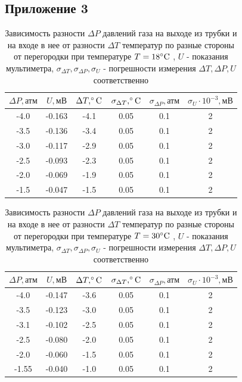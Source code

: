 \subsection{Приложение 3} \label{Приложение 3}
\begin{table}[h]
    \centering
    \begin{tabular}{|c|c|c|c|c|c|}
    \hline
    $\Delta P, \text{атм}$ & $U, \text{мВ}$ & $\Delta T, \celsius$  & $\sigma_{\Delta T}, \celsius$  & $\sigma_{\Delta P}, \text{атм}$ & $\sigma_U\cdot 10^{-3}, \text{мВ}$ \\ \hline
     -4.0 & -0.163  & -4.1   & 0.05   & 0.1   & 2 \\ \hline
     -3.5 & -0.136  & -3.4   & 0.05   & 0.1   & 2 \\ \hline
     -3.0 & -0.117  & -2.9   & 0.05   & 0.1   & 2 \\ \hline
     -2.5 & -0.093  & -2.3   & 0.05   & 0.1   & 2 \\ \hline
     -2.0 & -0.069  & -1.9   & 0.05   & 0.1   & 2 \\ \hline
     -1.5 & -0.047  & -1.5   & 0.05   & 0.1   & 2 \\ \hline
\end{tabular}
    \caption{Зависимость разности $\Delta P$ давлений газа на выходе из трубки и на входе в нее от разности $\Delta T$ температур по разные стороны от перегородки при температуре $T = 18\celsius$ , $U$ - показания мультиметра, $\sigma_{\Delta T}, \sigma_{\Delta P}, \sigma_U$ - погрешности измерения $\Delta T, \Delta P, U$ соответственно}
    \label{tab:t1}
\end{table}

\begin{table}[h]
    \centering
    \begin{tabular}{|c|c|c|c|c|c|}
    \hline
    $\Delta P, \text{атм}$ & $U, \text{мВ}$ & $\Delta T, \celsius$  & $\sigma_{\Delta T}, \celsius$  & $\sigma_{\Delta P}, \text{атм}$ & $\sigma_U\cdot 10^{-3}, \text{мВ}$ \\ \hline
     -4.0  & -0.147  & -3.6   & 0.05   & 0.1   & 2 \\ \hline
     -3.5  & -0.123  & -3.0   & 0.05   & 0.1   & 2 \\ \hline
     -3.1  & -0.102  & -2.5   & 0.05   & 0.1   & 2 \\ \hline
     -2.5  & -0.080  & -2.0   & 0.05   & 0.1   & 2 \\ \hline
     -2.0  & -0.060  & -1.5   & 0.05   & 0.1   & 2 \\ \hline
     -1.55 & -0.040  & -1.0   & 0.05   & 0.1   & 2 \\ \hline
\end{tabular}
    \caption{Зависимость разности $\Delta P$ давлений газа на выходе из трубки и на входе в нее от разности $\Delta T$ температур по разные стороны от перегородки при температуре $T = 30\celsius$ , $U$ - показания мультиметра, $\sigma_{\Delta T}, \sigma_{\Delta P}, \sigma_U$ - погрешности измерения $\Delta T, \Delta P, U$ соответственно}
    \label{tab:t1}
\end{table}

